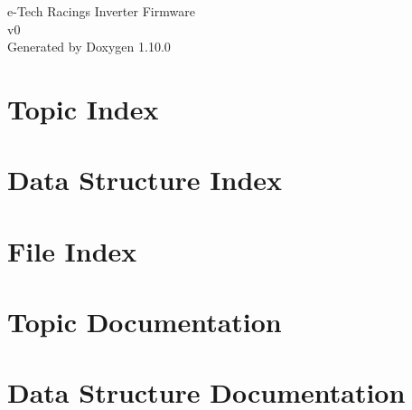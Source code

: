 \documentclass[twoside]{book}
\newcommand{\+}{\discretionary{\mbox{\scriptsize$\hookleftarrow$}}{}{}}
\newcommand{\clearemptydoublepage}{%
    \newpage{\pagestyle{empty}\cleardoublepage}%
  }
\begin{document}
  \raggedbottom
    \hypersetup{pageanchor=false,
                bookmarksnumbered=true,
                pdfencoding=unicode
               }
  \begin{titlepage}
  \vspace*{7cm}
  \begin{center}%
  {\Large e-\/\+Tech Racing\textquotesingle{}s Inverter Firmware}\\
  [1ex]\large v0 \\
  \vspace*{1cm}
  {\large Generated by Doxygen 1.10.0}\\
  \end{center}
  \end{titlepage}
  \clearemptydoublepage
  \tableofcontents
  \clearemptydoublepage
  \hypersetup{pageanchor=true}
\chapter{Topic Index}

\chapter{Data Structure Index}

\chapter{File Index}

\chapter{Topic Documentation}







\chapter{Data Structure Documentation}





















\end{document}
